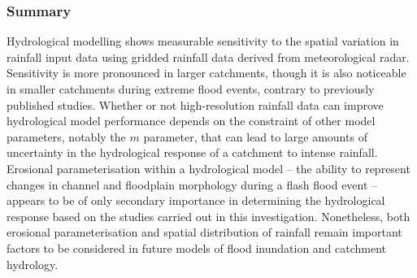 \subsubsection{Summary}
Hydrological modelling shows measurable sensitivity to the spatial variation in rainfall input data using gridded rainfall data derived from meteorological radar. Sensitivity is more pronounced in larger catchments, though it is also noticeable in smaller catchments during extreme flood events, contrary to previously published studies. Whether or not high-resolution  rainfall data can improve hydrological model performance depends on the constraint of other model parameters, notably the \(m\) parameter, that can lead to large amounts of uncertainty in the hydrological response of a catchment to intense rainfall. Erosional parameterisation within a hydrological model -- the ability to represent changes in channel and floodplain morphology during a flash flood event -- appears to be of only secondary importance in determining the hydrological response based on the studies carried out in this investigation. Nonetheless, both erosional parameterisation and spatial distribution of rainfall remain important factors to be considered in future models of flood inundation and catchment hydrology.




